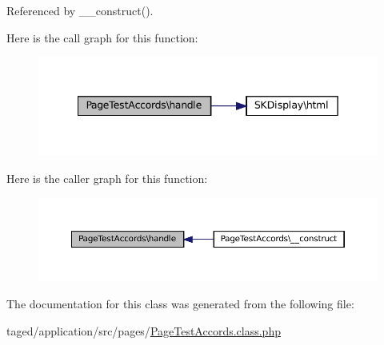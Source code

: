 Referenced by \+\_\+\+\_\+construct().

Here is the call graph for this function\+:\nopagebreak
\begin{figure}[H]
\begin{center}
\leavevmode
\includegraphics[width=342pt]{class_page_test_accords_a13df380846bd8e51f5f1bb405894d543_cgraph}
\end{center}
\end{figure}
Here is the caller graph for this function\+:\nopagebreak
\begin{figure}[H]
\begin{center}
\leavevmode
\includegraphics[width=350pt]{class_page_test_accords_a13df380846bd8e51f5f1bb405894d543_icgraph}
\end{center}
\end{figure}


The documentation for this class was generated from the following file\+:\begin{DoxyCompactItemize}
\item 
taged/application/src/pages/\hyperlink{_page_test_accords_8class_8php}{Page\+Test\+Accords.\+class.\+php}\end{DoxyCompactItemize}
